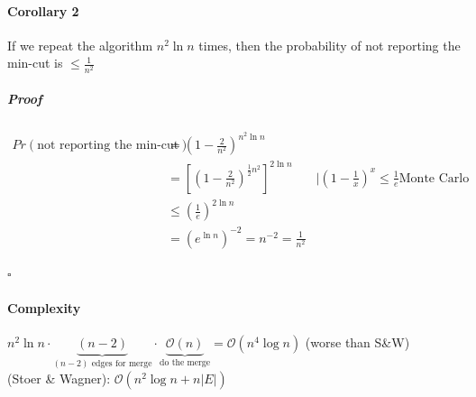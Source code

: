 \paragraph{Corollary 2} If we repeat the algorithm $n^2 \ln n$ times, then the probability of not reporting the min-cut is $\leq \frac{1}{n^2}$
\subparagraph{Proof}
\begin{align*}
	Pr(\text{not reporting the min-cut}) &= (1-\frac{2}{n^2})^{n^2 \ln n} \\
	&=\left[ \left( 1- \frac{2}{n^2}\right)^{\frac{1}{2}n^2} \right]^{2 \ln n} &| (1-\frac{1}{x})^x \leq \frac{1}{e} \text{Monte Carlo}\\
	&\leq \left( \frac{1}{e} \right)^{2 \ln n} \\
	&= (e^{\ln n})^{-2} = n^{-2} = \frac{1}{n^2} 
\end{align*}
\begin{flushright}
	$\square$
\end{flushright}
\paragraph{Complexity} $n^2 \ln n \cdot \underbrace{(n-2)}_{(n-2)\text{ edges for merge}} \cdot \underbrace{\mathcal{O}(n)}_{\text{do the merge}} = \mathcal{O}(n^4 \log n)$ (worse than S\&W) \\
(Stoer \& Wagner): $\mathcal{O}(n^2 \log n + n|E|)$


